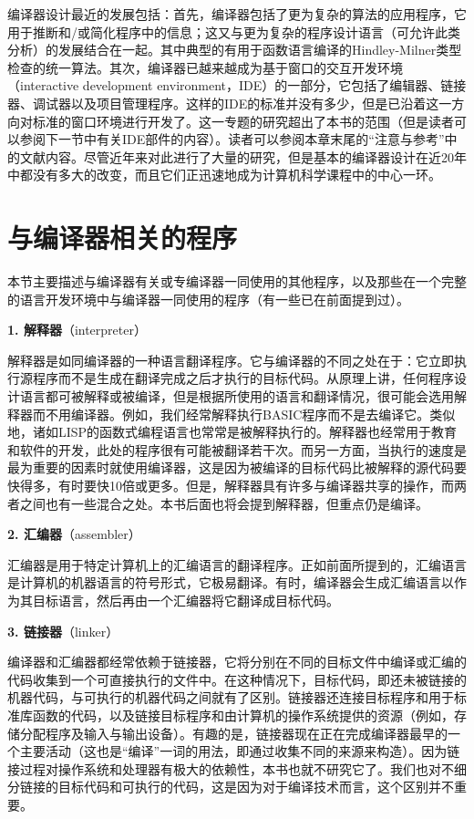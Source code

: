 \documentclass[lang=cn,10pt]{elegantbook}
\begin{document}
编译器设计最近的发展包括：首先，编译器包括了更为复杂的算法的应用程序，它用于推断和/或简化程序中的信息；这又与更为复杂的程序设计语言（可允许此类分析）的发展结合在一起。其中典型的有用于函数语言编译的Hindley-Milner类型检查的统一算法。其次，编译器已越来越成为基于窗口的交互开发环境（interactive development environment，IDE）的一部分，它包括了编辑器、链接器、调试器以及项目管理程序。这样的IDE的标准并没有多少，但是已沿着这一方向对标准的窗口环境进行开发了。这一专题的研究超出了本书的范围（但是读者可以参阅下一节中有关IDE部件的内容）。读者可以参阅本章末尾的“注意与参考”中的文献内容。尽管近年来对此进行了大量的研究，但是基本的编译器设计在近20年中都没有多大的改变，而且它们正迅速地成为计算机科学课程中的中心一环。

\section{与编译器相关的程序}
\label{sec:1-2}

本节主要描述与编译器有关或专编译器一同使用的其他程序，以及那些在一个完整的语言开发环境中与编译器一同使用的程序（有一些已在前面提到过）。

\textbf{1. 解释器}（interpreter）

解释器是如同编译器的一种语言翻译程序。它与编译器的不同之处在于：它立即执行源程序而不是生成在翻译完成之后才执行的目标代码。从原理上讲，任何程序设计语言都可被解释或被编译，但是根据所使用的语言和翻译情况，很可能会选用解释器而不用编译器。例如，我们经常解释执行BASIC程序而不是去编译它。类似地，诸如LISP的函数式编程语言也常常是被解释执行的。解释器也经常用于教育和软件的开发，此处的程序很有可能被翻译若干次。而另一方面，当执行的速度是最为重要的因素时就使用编译器，这是因为被编译的目标代码比被解释的源代码要快得多，有时要快10倍或更多。但是，解释器具有许多与编译器共享的操作，而两者之间也有一些混合之处。本书后面也将会提到解释器，但重点仍是编译。

\textbf{2. 汇编器}（assembler）

汇编器是用于特定计算机上的汇编语言的翻译程序。正如前面所提到的，汇编语言是计算机的机器语言的符号形式，它极易翻译。有时，编译器会生成汇编语言以作为其目标语言，然后再由一个汇编器将它翻译成目标代码。

\textbf{3. 链接器}（linker）

编译器和汇编器都经常依赖于链接器，它将分别在不同的目标文件中编译或汇编的代码收集到一个可直接执行的文件中。在这种情况下，目标代码，即还未被链接的机器代码，与可执行的机器代码之间就有了区别。链接器还连接目标程序和用于标准库函数的代码，以及链接目标程序和由计算机的操作系统提供的资源（例如，存储分配程序及输入与输出设备）。有趣的是，链接器现在正在完成编译器最早的一个主要活动（这也是“编译”一词的用法，即通过收集不同的来源来构造）。因为链接过程对操作系统和处理器有极大的依赖性，本书也就不研究它了。我们也对不细分链接的目标代码和可执行的代码，这是因为对于编译技术而言，这个区别并不重要。
\end{document}
